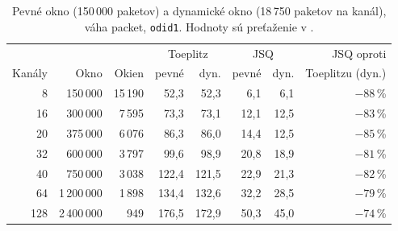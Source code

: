 \begin{table}[ht]
  \centering
  \small
  \caption{Pevné okno (150\,000 paketov) a dynamické okno (18\,750 paketov na kanál), váha packet, \texttt{odid1}. Hodnoty sú preťaženie v \textperthousand.}
  \label{tab:dynamicke-okno}
  \begin{tabular}{r r r rr rr r}
    \toprule
    & & & \multicolumn{2}{c}{Toeplitz} & \multicolumn{2}{c}{JSQ} & JSQ oproti \\
    Kanály & Okno & Okien & pevné & dyn. & pevné & dyn. & Toeplitzu (dyn.) \\
    \midrule
    8 & 150\,000 & 15\,190 & 52,3 & 52,3 & 6,1 & 6,1 & $-88$\,\% \\
    16 & 300\,000 & 7\,595 & 73,3 & 73,1 & 12,1 & 12,5 & $-83$\,\% \\
    20 & 375\,000 & 6\,076 & 86,3 & 86,0 & 14,4 & 12,5 & $-85$\,\% \\
    32 & 600\,000 & 3\,797 & 99,6 & 98,9 & 20,8 & 18,9 & $-81$\,\% \\
    40 & 750\,000 & 3\,038 & 122,4 & 121,5 & 22,9 & 21,3 & $-82$\,\% \\
    64 & 1\,200\,000 & 1\,898 & 134,4 & 132,6 & 32,2 & 28,5 & $-79$\,\% \\
    128 & 2\,400\,000 & 949 & 176,5 & 172,9 & 50,3 & 45,0 & $-74$\,\% \\
    \bottomrule
  \end{tabular}
\end{table}
